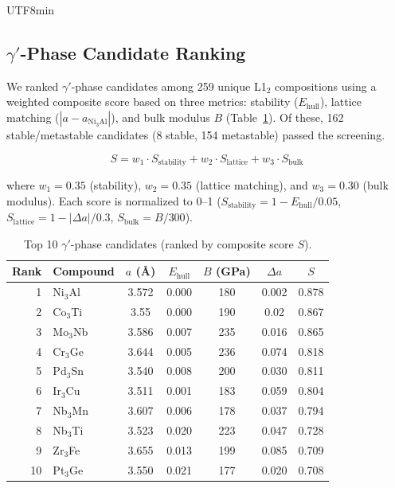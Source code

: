 \documentclass[sn-mathphys,Numbered]{sn-jnl}
\begin{document}
\begin{CJK}{UTF8}{min}
\subsection{$\gamma'$-Phase Candidate Ranking}
\label{sec:gamma_prime}

We ranked $\gamma'$-phase candidates among 259 unique L1$_2$
compositions using a weighted composite score based on three
metrics: stability ($E_\text{hull}$), lattice matching
($|a - a_{\text{Ni}_3\text{Al}}|$), and bulk modulus $B$
(Table~\ref{tab:gamma_prime}).
Of these, 162 stable/metastable candidates (8 stable, 154
metastable) passed the screening.

\begin{equation}
  S = w_1 \cdot S_\text{stability} + w_2 \cdot S_\text{lattice} + w_3 \cdot S_\text{bulk}
  \label{eq:composite_score}
\end{equation}

where $w_1 = 0.35$ (stability), $w_2 = 0.35$ (lattice matching),
and $w_3 = 0.30$ (bulk modulus).
Each score is normalized to 0--1
($S_\text{stability} = 1 - E_\text{hull}/0.05$,
$S_\text{lattice} = 1 - |\Delta a|/0.3$,
$S_\text{bulk} = B/300$).

\begin{table}[t]
  \centering
  \caption{Top 10 $\gamma'$-phase candidates (ranked by composite score $S$).}
  \label{tab:gamma_prime}
  \small
  \begin{tabular}{rlccccc}
    \toprule
    Rank & Compound & $a$ (\AA) & $E_\text{hull}$ & $B$ (GPa) & $\Delta a$ & $S$ \\
    \midrule
    1 & Ni$_3$Al & 3.572 & 0.000 & 180 & 0.002 & 0.878 \\
    2 & Co$_3$Ti & 3.55 & 0.000 & 190 & 0.02 & 0.867 \\
    3 & Mo$_3$Nb & 3.586 & 0.007 & 235 & 0.016 & 0.865 \\
    4 & Cr$_3$Ge & 3.644 & 0.005 & 236 & 0.074 & 0.818 \\
    5 & Pd$_3$Sn & 3.540 & 0.008 & 200 & 0.030 & 0.811 \\
    6 & Ir$_3$Cu & 3.511 & 0.001 & 183 & 0.059 & 0.804 \\
    7 & Nb$_3$Mn & 3.607 & 0.006 & 178 & 0.037 & 0.794 \\
    8 & Nb$_3$Ti & 3.523 & 0.020 & 223 & 0.047 & 0.728 \\
    9 & Zr$_3$Fe & 3.655 & 0.013 & 199 & 0.085 & 0.709 \\
    10 & Pt$_3$Ge & 3.550 & 0.021 & 177 & 0.020 & 0.708 \\
    \bottomrule
  \end{tabular}
\end{table}


\end{CJK}
\end{document}
